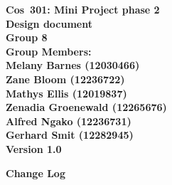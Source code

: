 \documentclass[12pt]{article}
\newcommand{\Title}{Design document} %
\newcommand{\Class}{Cos\ 301} %
\begin{document}
	\vspace{4em}
	
	\begin{center}%
	\LARGE \bf \Class: Mini Project phase 2 \\
	  \LARGE \bf \Title \\[4em]
	  \LARGE {\bf Group 8}\\[1em]
	  \LARGE {\bf Group Members:}\\[2em]
	  \large
	     Melany Barnes					(12030466) \\[1em]
	     Zane Bloom						(12236722) \\[1em]
	     Mathys Ellis					(12019837) \\[1em]
	     Zenadia Groenewald				(12265676) \\[1em]
	     Alfred Ngako					(12236731) \\[1em]
	  	 Gerhard Smit					(12282945) \\[1em]
	     {\bf Version 1.0}
	    
	\end{center}
	
	\newpage
		{\LARGE \bf Change Log}\\[2em]
		
\end{document}
